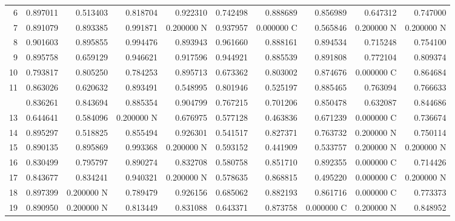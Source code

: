\documentclass[10pt]{reportMaster}
\begin{document}
\begin{table}[t]
\begin{threeparttable}
{\begin{tabular}{@{}r r r r r r r r r r@{}}
6
& 0.897011 & 0.513403 & 0.818704
& 0.922310 & 0.742498 & 0.888689
& 0.856989 & 0.647312 & 0.747000 \\

7
& 0.891079 & 0.893385 & 0.991871
& 0.200000 N & 0.937957 & 0.000000 C
& 0.565846 & 0.200000 N & 0.200000 N \\

8
& 0.901603 & 0.895855 & 0.994476
& 0.893943 & 0.961660 & 0.888161
& 0.894534 & 0.715248 & 0.754100 \\

9
& 0.895758 & 0.659129 & 0.946621
& 0.917596 & 0.944921 & 0.885539
& 0.891808 & 0.772104 & 0.809374 \\

10
& 0.793817 & 0.805250 & 0.784253
& 0.895713 & 0.673362 & 0.803002
& 0.874676 & 0.000000 C & 0.864684 \\

11
& 0.863026 & 0.620632 & 0.893491
& 0.548995 & 0.801946 & 0.525197
& 0.885465 & 0.763094 & 0.766633 \\

\addlinespace
12
& 0.836261 & 0.843694 & 0.885354
& 0.904799 & 0.767215 & 0.701206
& 0.850478 & 0.632087 & 0.844686 \\

13
& 0.644641 & 0.584096 & 0.200000 N
& 0.676975 & 0.577128 & 0.463836
& 0.671239 & 0.000000 C & 0.736674 \\

14
& 0.895297 & 0.518825 & 0.855494
& 0.926301 & 0.541517 & 0.827371
& 0.763732 & 0.200000 N & 0.750114 \\

15
& 0.890135 & 0.895869 & 0.993368
& 0.200000 N & 0.593152 & 0.441909
& 0.533757 & 0.200000 N & 0.200000 N \\

16
& 0.830499 & 0.795797 & 0.890274
& 0.832708 & 0.580758 & 0.851710
& 0.892355 & 0.000000 C & 0.714426 \\

17
& 0.843677 & 0.834241 & 0.940321
& 0.200000 N & 0.578635 & 0.868815
& 0.495220 & 0.000000 C & 0.200000 N \\

18
& 0.897399 & 0.200000 N & 0.789479
& 0.926156 & 0.685062 & 0.882193
& 0.861716 & 0.000000 C & 0.773373 \\

19
& 0.890950 & 0.200000 N & 0.813449
& 0.831088 & 0.643371 & 0.873758
& 0.000000 C & 0.200000 N & 0.848952 \\


\end{tabular}}
\end{threeparttable}
\end{table}
\end{document}
